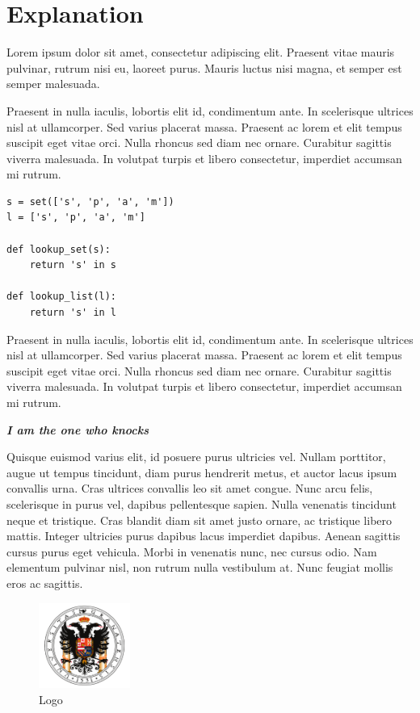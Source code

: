\section{Explanation}

Lorem ipsum dolor sit amet, consectetur adipiscing elit. Praesent vitae mauris
pulvinar, rutrum nisi eu, laoreet purus. Mauris luctus nisi magna, et semper
est semper malesuada.

Praesent in nulla iaculis, lobortis elit id, condimentum
ante. In scelerisque ultrices nisl at ullamcorper. Sed varius placerat massa.
Praesent ac lorem et elit tempus suscipit eget vitae orci. Nulla rhoncus sed
diam nec ornare. Curabitur sagittis viverra malesuada. In volutpat turpis et
libero consectetur, imperdiet accumsan mi rutrum.

\begin{verbatim}
s = set(['s', 'p', 'a', 'm'])
l = ['s', 'p', 'a', 'm']

def lookup_set(s):
    return 's' in s

def lookup_list(l):
    return 's' in l
\end{verbatim}

Praesent in nulla iaculis, lobortis elit id, condimentum
ante. In scelerisque ultrices nisl at ullamcorper. Sed varius placerat massa.
Praesent ac lorem et elit tempus suscipit eget vitae orci. Nulla rhoncus sed
diam nec ornare. Curabitur sagittis viverra malesuada. In volutpat turpis et
libero consectetur, imperdiet accumsan mi rutrum.

\begin{center}
    \textbf{\emph{I am the one who knocks}}
\end{center}

Quisque euismod varius elit, id posuere purus ultricies vel. Nullam porttitor,
augue ut tempus tincidunt, diam purus hendrerit metus, et auctor lacus ipsum
convallis urna. Cras ultrices convallis leo sit amet congue. Nunc arcu felis,
scelerisque in purus vel, dapibus pellentesque sapien. Nulla venenatis
tincidunt neque et tristique. Cras blandit diam sit amet justo ornare, ac
tristique libero mattis. Integer ultricies purus dapibus lacus imperdiet
dapibus. Aenean sagittis cursus purus eget vehicula. Morbi in venenatis nunc,
nec cursus odio. Nam elementum pulvinar nisl, non rutrum nulla vestibulum at.
Nunc feugiat mollis eros ac sagittis.

\begin{figure}[H]
    \centering
    \includegraphics[width=3cm]{figures/logos/logo_ugr.png}
    \caption{Logo}
    \label{logo}
\end{figure}

